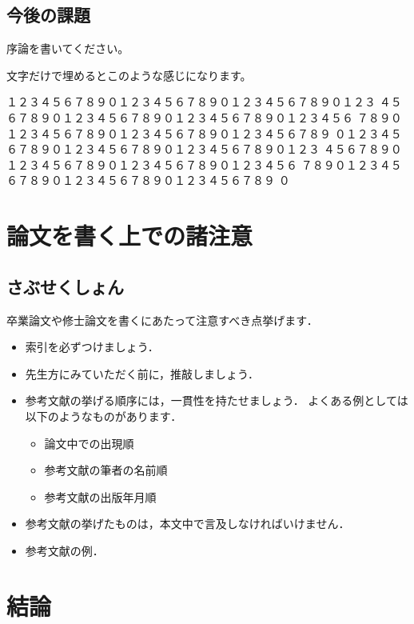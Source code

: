 \documentclass{eniepaper}
\begin{document}
   \section{今後の課題}
   
   序論を書いてください。\newpage

   文字だけで埋めるとこのような感じになります。

   \noindent
   １２３４５６７８９０１２３４５６７８９０１２３４５６７８９０１２３
   ４５６７８９０１２３４５６７８９０１２３４５６７８９０１２３４５６
   ７８９０１２３４５６７８９０１２３４５６７８９０１２３４５６７８９
   ０１２３４５６７８９０１２３４５６７８９０１２３４５６７８９０１２３
   ４５６７８９０１２３４５６７８９０１２３４５６７８９０１２３４５６
   ７８９０１２３４５６７８９０１２３４５６７８９０１２３４５６７８９
   ０

   \chapter{論文を書く上での諸注意}
   \section{さぶせくしょん}
                                                          
   卒業論文や修士論文を書くにあたって注意すべき点挙げます．
   \begin{itemize}
    \item 索引を必ずつけましょう．
    \item 先生方にみていただく前に，推敲しましょう．
    \item 参考文献の挙げる順序には，一貫性を持たせましょう．
          よくある例としては以下のようなものがあります．
     \begin{itemize}
      \item 論文中での出現順
      \item 参考文献の筆者の名前順
      \item 参考文献の出版年月順
     \end{itemize}
    \item 参考文献の挙げたものは，本文中で言及しなければいけません．
    \item 参考文献の例\cite{Thesis2001}．
   \end{itemize}

   \chapter{結論}      
\end{document}
